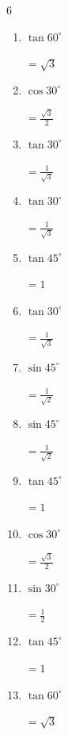 \begin{multicols}{6}
\begin{enumerate}
  \item $\displaystyle \tan{60^\circ}$

        $\displaystyle =\sqrt{3}$

  \item $\displaystyle \cos{30^\circ}$

        $\displaystyle =\frac{\sqrt{3}}{2}$

  \item $\displaystyle \tan{30^\circ}$

        $\displaystyle =\frac{1}{\sqrt{3}}$

  \item $\displaystyle \tan{30^\circ}$

        $\displaystyle =\frac{1}{\sqrt{3}}$

  \item $\displaystyle \tan{45^\circ}$

        $\displaystyle =1$

  \item $\displaystyle \tan{30^\circ}$

        $\displaystyle =\frac{1}{\sqrt{3}}$

  \item $\displaystyle \sin{45^\circ}$

        $\displaystyle =\frac{1}{\sqrt{2}}$

  \item $\displaystyle \sin{45^\circ}$

        $\displaystyle =\frac{1}{\sqrt{2}}$

  \item $\displaystyle \tan{45^\circ}$

        $\displaystyle =1$

  \item $\displaystyle \cos{30^\circ}$

        $\displaystyle =\frac{\sqrt{3}}{2}$

  \item $\displaystyle \sin{30^\circ}$

        $\displaystyle =\frac{1}{2}$

  \item $\displaystyle \tan{45^\circ}$

        $\displaystyle =1$

  \item $\displaystyle \tan{60^\circ}$

        $\displaystyle =\sqrt{3}$

\columnbreak %


\end{enumerate}
\end{multicols}
